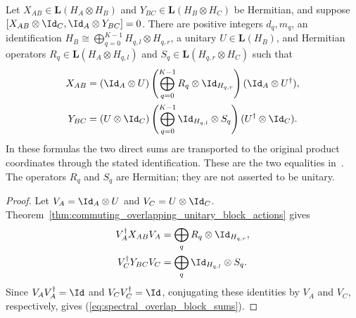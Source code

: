 \begin{theorem}%
    \label{thm:commuting_overlapping_block_sum_equalities}
    \leanok
    Let $X_{AB}\in\mathbf L(H_A\otimes H_B)$ and
    $Y_{BC}\in\mathbf L(H_B\otimes H_C)$ be Hermitian, and suppose
    $[X_{AB}\otimes\Id_C,\Id_A\otimes Y_{BC}]=0$. There are positive
    integers $d_q,m_q$, an identification
    $H_B\cong\bigoplus_{q=0}^{K-1}H_{q,l}\otimes H_{q,r}$, a unitary
    $U\in\mathbf L(H_B)$, and Hermitian operators
    $R_q\in\mathbf L(H_A\otimes H_{q,l})$ and
    $S_q\in\mathbf L(H_{q,r}\otimes H_C)$ such that
    \begin{align}
        X_{AB}
         & =(\Id_A\otimes U)
        \left(\bigoplus_{q=0}^{K-1}
        R_q\otimes\Id_{H_{q,r}}\right)
        (\Id_A\otimes U^\dagger), \notag \\
        Y_{BC}
         & =(U\otimes\Id_C)
        \left(\bigoplus_{q=0}^{K-1}
        \Id_{H_{q,l}}\otimes S_q\right)
        (U^\dagger\otimes\Id_C).
        \label{eq:spectral_overlap_block_sums}
    \end{align}
    In these formulas the two direct sums are transported to the original
    product coordinates through the stated identification. These are the
    two equalities in~\cite[Lemma~2.1]{Beigi2012Classification}. The
    operators $R_q$ and $S_q$ are Hermitian; they are not asserted to be
    unitary.
\end{theorem}

\begin{proof}
    \leanok
    Let $V_A=\Id_A\otimes U$ and $V_C=U\otimes\Id_C$.
    Theorem~\ref{thm:commuting_overlapping_unitary_block_actions} gives
    \begin{align}
        V_A^\dagger X_{AB}V_A
         & =\bigoplus_qR_q\otimes\Id_{H_{q,r}}, \notag \\
        V_C^\dagger Y_{BC}V_C
         & =\bigoplus_q\Id_{H_{q,l}}\otimes S_q.
        \notag
    \end{align}
    Since $V_AV_A^\dagger=\Id$ and $V_CV_C^\dagger=\Id$, conjugating these
    identities by $V_A$ and $V_C$, respectively, gives
    (\ref{eq:spectral_overlap_block_sums}).
\end{proof}
